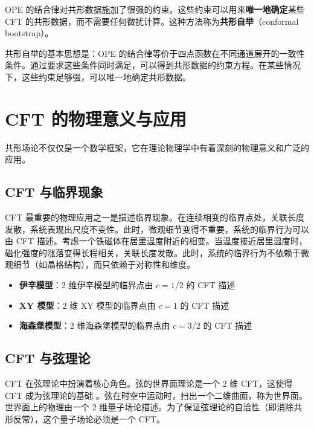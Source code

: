 \begin{definition}[共形自举]
OPE 的结合律对共形数据施加了很强的约束。这些约束可以用来\textbf{唯一地确定}某些 CFT 的共形数据，而不需要任何微扰计算。这种方法称为\textbf{共形自举}（conformal bootstrap）。

共形自举的基本思想是：OPE 的结合律等价于四点函数在不同通道展开的一致性条件。通过要求这些条件同时满足，可以得到共形数据的约束方程。在某些情况下，这些约束足够强，可以唯一地确定共形数据。
\end{definition}

\section{CFT 的物理意义与应用}

共形场论不仅仅是一个数学框架，它在理论物理学中有着深刻的物理意义和广泛的应用。

\subsection{CFT 与临界现象}

\begin{note}[物理动机]
CFT 最重要的物理应用之一是描述临界现象。在连续相变的临界点处，关联长度发散，系统表现出尺度不变性。此时，微观细节变得不重要，系统的临界行为可以由 CFT 描述。考虑一个铁磁体在居里温度附近的相变。当温度接近居里温度时，磁化强度的涨落变得长程相关，关联长度发散。此时，系统的临界行为不依赖于微观细节（如晶格结构），而只依赖于对称性和维度。
\end{note}

\begin{example}
\begin{itemize}
    \item \textbf{伊辛模型}：2 维伊辛模型的临界点由 $c = 1/2$ 的 CFT 描述
    \item \textbf{XY 模型}：2 维 XY 模型的临界点由 $c = 1$ 的 CFT 描述
    \item \textbf{海森堡模型}：2 维海森堡模型的临界点由 $c = 3/2$ 的 CFT 描述
\end{itemize}
\end{example}

\subsection{CFT 与弦理论}

\begin{note}[物理动机]
CFT 在弦理论中扮演着核心角色。弦的世界面理论是一个 2 维 CFT，这使得 CFT 成为弦理论的基础 \cite{Polchinski1998}。弦在时空中运动时，扫出一个二维曲面，称为世界面。世界面上的物理由一个 2 维量子场论描述。为了保证弦理论的自洽性（即消除共形反常），这个量子场论必须是一个 CFT。
\end{note}


